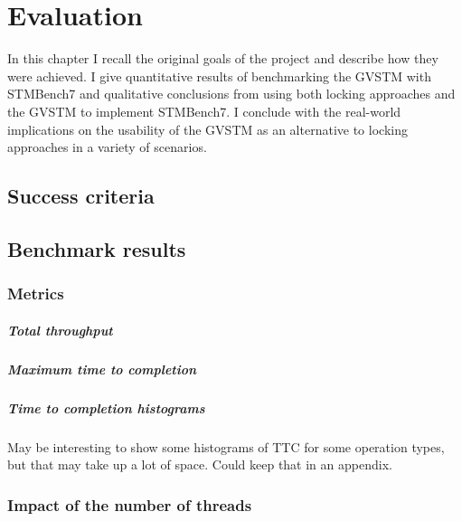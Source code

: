 \documentclass[12pt,a4paper,oneside,openright]{report}
\begin{document}

\chapter{Evaluation}

In this chapter I recall the original goals of the project and
describe how they were achieved. I give quantitative results of
benchmarking the GVSTM with STMBench7 and qualitative conclusions from
using both locking approaches and the GVSTM to implement STMBench7. I
conclude with the real-world implications on the usability of the
GVSTM as an alternative to locking approaches in a variety of
scenarios.

\section{Success criteria}
\label{sec:eval:success-criteria}


\section{Benchmark results}
\label{sec:eval:benchmark-results}

\subsection{Metrics}
\label{sec:eval:metrics}

\paragraph{Total throughput}

\paragraph{Maximum time to completion}

\paragraph{Time to completion histograms}
May be interesting to show some histograms of TTC for some operation
types, but that may take up a lot of space. Could keep that in an
appendix.

\subsection{Impact of the number of threads}
\label{sec:eval:impact-numb-thre}
\end{document}
